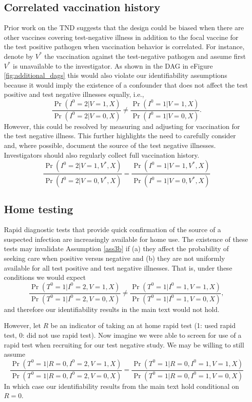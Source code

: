 \begin{appendix}
\begin{refsection}
    \subsection{Correlated vaccination history}
    Prior work on the TND suggests that the design could be biased when there are other vaccines covering test-negative illness in addition to the focal vaccine for the test positive pathogen when vaccination behavior is correlated. For instance, denote by $V^*$ the vaccination against the test-negative pathogen and assume first $V^*$ is unavailable to the investigator. As shown in the DAG in eFigure \ref{fig:additional_dags} this would also violate our identifiability assumptions because it would imply the existence of a confounder that does not affect the test positive and test negative illnesses equally, i.e., 
    \[\dfrac{\Pr(I^0 = 2 | V =1, X)}{\Pr(I^0 = 2 | V =0, X)} \neq \dfrac{\Pr(I^0 = 1 | V =1, X)}{\Pr(I^0 = 1 | V =0, X)}. \]
    However, this could be resolved by measuring and adjusting for vaccination for the test negative illness. This further highlights the need to carefully consider and, where possible, document the source of the test negative illnesses. Investigators should also regularly collect full vaccination history.
    \[\dfrac{\Pr(I^0 = 2 | V =1, V^*, X)}{\Pr(I^0 = 2 | V =0, V^*, X)} = \dfrac{\Pr(I^0 = 1 | V =1,V^*,  X)}{\Pr(I^0 = 1 | V =0,V^*,  X)} \]

    \subsection{Home testing}
    Rapid diagnostic tests that provide quick confirmation of the source of a suspected infection are increasingly available for home use. The existence of these tests may invalidate Assumption \ref{ass3b} if (a) they affect the probability of seeking care when positive versus negative and (b) they are not uniformly available for all test positive and test negative illnesses. That is, under these conditions we would expect
    \[\dfrac{\Pr(T^0 = 1 | I^0 =2, V =1, X)}{\Pr(T^0 = 1 | I^0 =2, V =0, X)} \neq\dfrac{\Pr(T^0 = 1 | I^0 =1, V =1, X)}{\Pr(T^0 = 1 | I^0 =1, V =0, X)},\]
    and therefore our identifiability results in the main text would not hold. 
    
    However, let $R$ be an indicator of taking an at home rapid test (1: used rapid test, 0: did not use rapid test). Now imagine we were able to screen for use of a rapid test when recruiting for our test negative study. We may be willing to still assume 
    \[\dfrac{\Pr(T^0 = 1 | R =0, I^0 =2, V =1, X)}{\Pr(T^0 = 1 |  R =0,  I^0 =2, V =0, X)} = \dfrac{\Pr(T^0 = 1 |  R =0, I^0 =1, V =1, X)}{\Pr(T^0 = 1 |  R =0, I^0 =1, V =0, X)} \]
    In which case our identifiability results from the main text hold conditional on $R=0$. 


\end{refsection}
\end{appendix}
